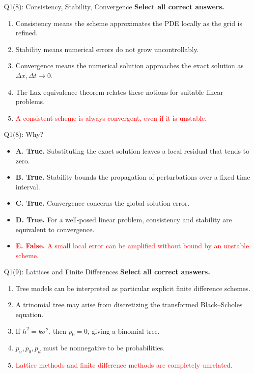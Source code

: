 \documentclass{beamer}
\newcommand{\wrong}[1]{\textcolor{red}{#1}}
\begin{document}
\begin{frame}{Q1(8): Consistency, Stability, Convergence}
\small
\textbf{Select all correct answers.}
\begin{enumerate}
\item[A.] Consistency means the scheme approximates the PDE locally
as the grid is refined.
\item[B.] Stability means numerical errors do not grow uncontrollably.
\item[C.] Convergence means the numerical solution approaches the exact
solution as $\Delta x,\Delta t\to0$.
\item[D.] The Lax equivalence theorem relates these notions for
suitable linear problems.
\item[\wrong{E.}] \wrong{A consistent scheme is always convergent,
even if it is unstable.}
\end{enumerate}
\end{frame}

\begin{frame}{Q1(8): Why?}
\small
\begin{itemize}
\item \textbf{A. True.} Substituting the exact solution leaves a
local residual that tends to zero.
\item \textbf{B. True.} Stability bounds the propagation of
perturbations over a fixed time interval.
\item \textbf{C. True.} Convergence concerns the global solution error.
\item \textbf{D. True.} For a well-posed linear problem, consistency
and stability are equivalent to convergence.
\item \wrong{\textbf{E. False.} A small local error can be amplified
without bound by an unstable scheme.}
\end{itemize}
\end{frame}

\begin{frame}{Q1(9): Lattices and Finite Differences}
\small
\textbf{Select all correct answers.}
\begin{enumerate}
\item[A.] Tree models can be interpreted as particular explicit
finite difference schemes.
\item[B.] A trinomial tree may arise from discretizing the
transformed Black--Scholes equation.
\item[C.] If $h^2=k\sigma^2$, then $p_0=0$, giving a binomial tree.
\item[D.] $p_u,p_0,p_d$ must be nonnegative to be probabilities.
\item[\wrong{E.}] \wrong{Lattice methods and finite difference methods
are completely unrelated.}
\end{enumerate}
\end{frame}
\end{document}
